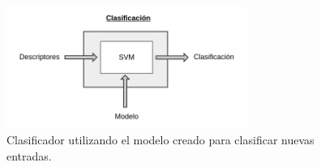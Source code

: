 	
	\begin{figure}[bt]
		\centering
  		\label{algoritmo:fig:clasificacion}
    		\includegraphics[width=0.7\textwidth]{Figuras/Diagramas/Clasificacion.png}
  		\caption{Clasificador utilizando el modelo creado para clasificar nuevas entradas.}
	\end{figure}	
		
	
	
	
	
	